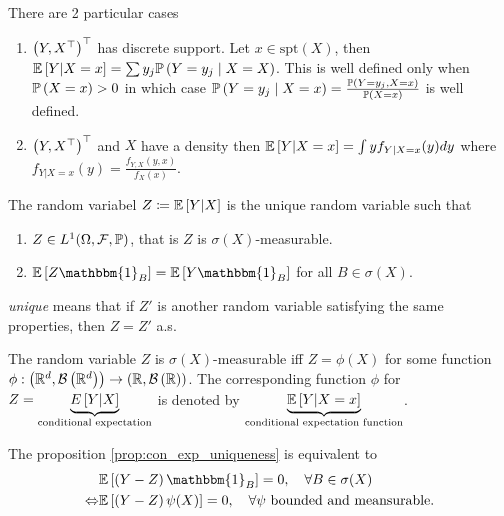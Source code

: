 There are 2 particular cases
\begin{enumerate}
    \item $\left(Y,X^\top\right)^\top$ has discrete support. Let $x\in \text{spt}(X)$, then $\mathbb{E}\left[Y|X=x\right]=\sum y_j \mathbb{P}\left(Y=y_j\mid X=X\right)$. This is well defined only when $\mathbb{P}\left(X=x\right)>0$ in which case $\mathbb{P}\left(Y=y_j\mid X=x\right)=\frac{\mathbb{P}\left(Y=y_j,X=x\right)}{\mathbb{P}\left(X=x\right)}$ is well defined.
    \item $\left(Y,X^\top\right)^\top$ and $X$ have a density then $\mathbb{E}\left[Y|X=x\right]=\int yf_{Y|X=x}(y)dy$ where $f_{Y|X=x}(y)=\frac{f_{Y,X}(y,x)}{f_X(x)}$.
\end{enumerate}
\begin{proposition}
    The random variabel $Z \coloneqq \mathbb{E}\left[Y|X\right]$ is the unique random variable such that
    \begin{enumerate}
        \item $Z\in L^1(\Omega, \mathcal{F}, \mathbb{P})$, that is $Z$ is $\sigma(X)$-measurable.
        \item \label{prop:con_exp_uniqueness}$\E\bra{Z\mathbbm{1}_B}=\E\bra{Y\mathbbm{1}_B}$ for all $B\in \sigma(X)$.
    \end{enumerate}
    \emph{unique} means that if $Z'$ is another random variable satisfying the same properties, then $Z=Z'$ a.s.
\end{proposition}
\begin{remark}
    The random variable $Z$ is $\sigma(X)$-measurable iff $Z=\phi(X)$ for some function $\phi:\left(\mathbb{R}^d,\mathcal{B}\left(\mathbb{R}^d\right)\right)\to\left(\mathbb{R},\mathcal{B}\left(\mathbb{R}\right)\right)$. The corresponding function $\phi$ for $Z=\underbrace{E\left[Y|X\right]}_{\text{conditional expectation}}$ is denoted by $\underbrace{\mathbb{E}\left[Y|X=x\right]}_\text{conditional expectation function}$.
\end{remark}
\begin{remark}
    The proposition \ref{prop:con_exp_uniqueness} is equivalent to
    \begin{align*}
         & \E\bra{\pa{Y-Z}\mathbbm{1}_B}=0, \quad \forall B\in \sigma(X) \\ \Leftrightarrow &\E\bra{\pa{Y-Z}\psi(X)}=0, \quad \forall \psi\ \text{bounded and meansurable}.
    \end{align*}
\end{remark}

